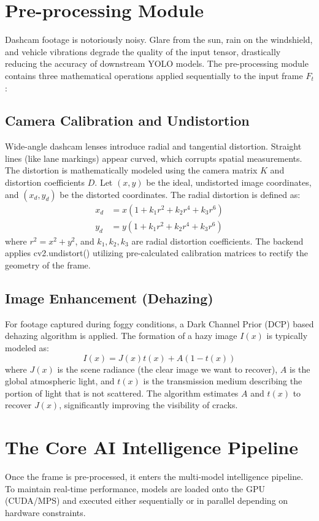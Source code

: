 \section{Pre-processing Module}
Dashcam footage is notoriously noisy. Glare from the sun, rain on the windshield, and vehicle vibrations degrade the quality of the input tensor, drastically reducing the accuracy of downstream YOLO models. The pre-processing module contains three mathematical operations applied sequentially to the input frame $F_t$:

\subsection{Camera Calibration and Undistortion}
Wide-angle dashcam lenses introduce radial and tangential distortion. Straight lines (like lane markings) appear curved, which corrupts spatial measurements. The distortion is mathematically modeled using the camera matrix $K$ and distortion coefficients $D$. Let $(x, y)$ be the ideal, undistorted image coordinates, and $(x_d, y_d)$ be the distorted coordinates. The radial distortion is defined as:
\begin{align}
    x_d &= x(1 + k_1 r^2 + k_2 r^4 + k_3 r^6) \\
    y_d &= y(1 + k_1 r^2 + k_2 r^4 + k_3 r^6)
\end{align}
where $r^2 = x^2 + y^2$, and $k_1, k_2, k_3$ are radial distortion coefficients. The backend applies cv2.undistort() utilizing pre-calculated calibration matrices to rectify the geometry of the frame.

\subsection{Image Enhancement (Dehazing)}
For footage captured during foggy conditions, a Dark Channel Prior (DCP) based dehazing algorithm is applied. The formation of a hazy image $I(x)$ is typically modeled as:
\begin{equation}
    I(x) = J(x)t(x) + A(1 - t(x))
\end{equation}
where $J(x)$ is the scene radiance (the clear image we want to recover), $A$ is the global atmospheric light, and $t(x)$ is the transmission medium describing the portion of light that is not scattered. The algorithm estimates $A$ and $t(x)$ to recover $J(x)$, significantly improving the visibility of cracks.

\section{The Core AI Intelligence Pipeline}
Once the frame is pre-processed, it enters the multi-model intelligence pipeline. To maintain real-time performance, models are loaded onto the GPU (CUDA/MPS) and executed either sequentially or in parallel depending on hardware constraints.

